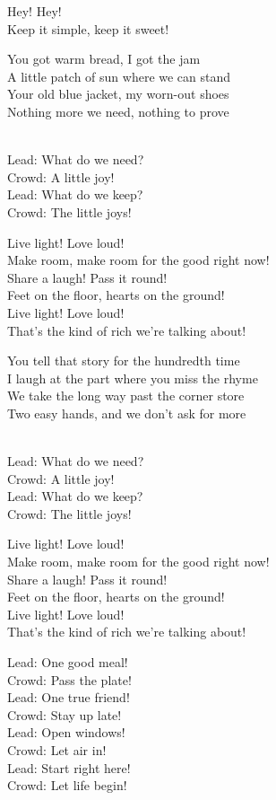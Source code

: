 \begin{lyrics}
Hey! Hey!\\
Keep it simple, keep it sweet!

You got warm bread, I got the jam\\
A little patch of sun where we can stand\\
Your old blue jacket, my worn-out shoes\\
Nothing more we need, nothing to prove

\\
Lead: What do we need?\\
Crowd: A little joy!\\
Lead: What do we keep?\\
Crowd: The little joys!

Live light! Love loud!\\
Make room, make room for the good right now!\\
Share a laugh! Pass it round!\\
Feet on the floor, hearts on the ground!\\
Live light! Love loud!\\
That’s the kind of rich we’re talking about!

You tell that story for the hundredth time\\
I laugh at the part where you miss the rhyme\\
We take the long way past the corner store\\
Two easy hands, and we don’t ask for more

\\
Lead: What do we need?\\
Crowd: A little joy!\\
Lead: What do we keep?\\
Crowd: The little joys!

Live light! Love loud!\\
Make room, make room for the good right now!\\
Share a laugh! Pass it round!\\
Feet on the floor, hearts on the ground!\\
Live light! Love loud!\\
That’s the kind of rich we’re talking about!

Lead: One good meal!\\
Crowd: Pass the plate!\\
Lead: One true friend!\\
Crowd: Stay up late!\\
Lead: Open windows!\\
Crowd: Let air in!\\
Lead: Start right here!\\
Crowd: Let life begin!


\end{lyrics}
